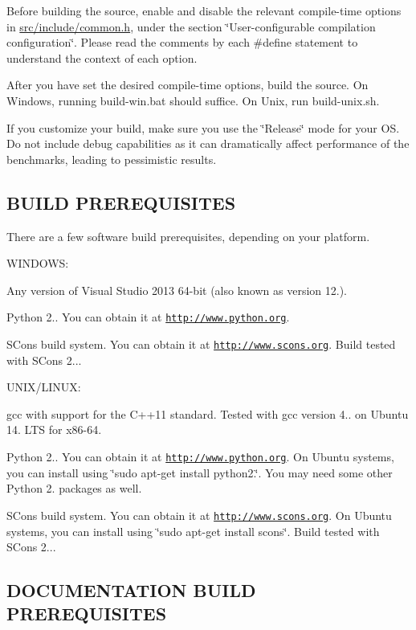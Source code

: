 Before building the source, enable and disable the relevant compile-\/time options in \hyperlink{common_8h}{src/include/common.\+h}, under the section \char`\"{}\+User-\/configurable compilation configuration\char`\"{}. Please read the comments by each \#define statement to understand the context of each option.

After you have set the desired compile-\/time options, build the source. On Windows, running build-\/win.\+bat should suffice. On Unix, run build-\/unix.\+sh.

If you customize your build, make sure you use the \char`\"{}\+Release\char`\"{} mode for your O\+S. Do not include debug capabilities as it can dramatically affect performance of the benchmarks, leading to pessimistic results. 

 \subsection*{B\+U\+I\+L\+D P\+R\+E\+R\+E\+Q\+U\+I\+S\+I\+T\+E\+S }

There are a few software build prerequisites, depending on your platform.

W\+I\+N\+D\+O\+W\+S\+:


\begin{DoxyItemize}
\item Any version of Visual Studio 2013 64-\/bit (also known as version 12.).
\item Python 2.. You can obtain it at \href{http://www.python.org}{\tt http\+://www.\+python.\+org}.
\item S\+Cons build system. You can obtain it at \href{http://www.scons.org}{\tt http\+://www.\+scons.\+org}. Build tested with S\+Cons 2...
\end{DoxyItemize}

U\+N\+I\+X/\+L\+I\+N\+U\+X\+:


\begin{DoxyItemize}
\item gcc with support for the C++11 standard. Tested with gcc version 4.. on Ubuntu 14. L\+T\+S for x86-\/64.
\item Python 2.. You can obtain it at \href{http://www.python.org}{\tt http\+://www.\+python.\+org}. On Ubuntu systems, you can install using \char`\"{}sudo apt-\/get install python2.\char`\"{}. You may need some other Python 2. packages as well.
\item S\+Cons build system. You can obtain it at \href{http://www.scons.org}{\tt http\+://www.\+scons.\+org}. On Ubuntu systems, you can install using \char`\"{}sudo apt-\/get install scons\char`\"{}. Build tested with S\+Cons 2... 

 \subsection*{D\+O\+C\+U\+M\+E\+N\+T\+A\+T\+I\+O\+N B\+U\+I\+L\+D P\+R\+E\+R\+E\+Q\+U\+I\+S\+I\+T\+E\+S }
\end{DoxyItemize}

